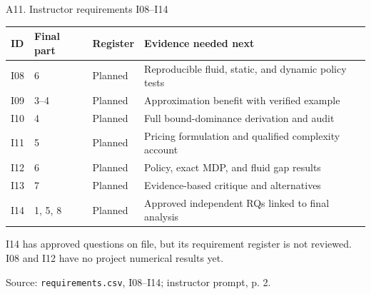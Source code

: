 \documentclass[aspectratio=169,10pt]{beamer}
\newcommand{\src}[1]{\par\vfill{\tiny\color{muted}Source: #1\par}}
\begin{document}
\begin{frame}[t]{A11. Instructor requirements I08--I14}
\footnotesize
\begin{tabularx}{\textwidth}{@{}p{}p{}p{}X@{}}
\toprule
ID & Final part & Register & Evidence needed next\\
\midrule
I08 & 6 & Planned & Reproducible fluid, static, and dynamic policy tests\\
I09 & 3--4 & Planned & Approximation benefit with verified example\\
I10 & 4 & Planned & Full bound-dominance derivation and audit\\
I11 & 5 & Planned & Pricing formulation and qualified complexity account\\
I12 & 6 & Planned & Policy, exact MDP, and fluid gap results\\
I13 & 7 & Planned & Evidence-based critique and alternatives\\
I14 & 1, 5, 8 & Planned & Approved independent RQs linked to final analysis\\
\bottomrule
\end{tabularx}
\medskip\par
I14 has approved questions on file, but its requirement register is not reviewed. I08 and I12 have no project numerical results yet.
\src{\texttt{requirements.csv}, I08--I14; instructor prompt, p. 2.}
\end{frame}
\end{document}

